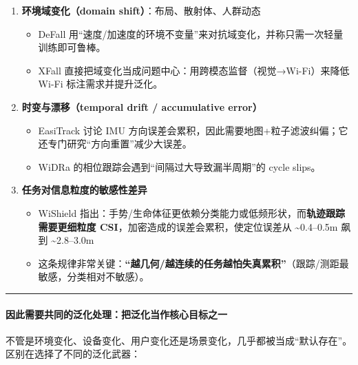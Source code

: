 \documentclass[
]{article}
\begin{document}
\begin{enumerate}
\def\labelenumi{\arabic{enumi}.}
\item
  \textbf{环境域变化（domain shift）}：布局、散射体、人群动态

  \begin{itemize}
  \item
    DeFall
    用``速度/加速度的环境不变量''来对抗域变化，并称只需一次轻量训练即可鲁棒。
  \item
    XFall 直接把域变化当成问题中心：用跨模态监督（视觉→Wi-Fi）来降低
    Wi-Fi 标注需求并提升泛化。
  \end{itemize}
\item
  \textbf{时变与漂移（temporal drift / accumulative error）}

  \begin{itemize}
  \item
    EasiTrack 讨论 IMU
    方向误差会累积，因此需要地图+粒子滤波纠偏；它还专门研究``方向重置''减少大误差。
  \item
    WiDRa 的相位跟踪会遇到``间隔过大导致漏半周期''的 cycle slips。
  \end{itemize}
\item
  \textbf{任务对信息粒度的敏感性差异}

  \begin{itemize}
  \item
    WiShield
    指出：手势/生命体征更依赖分类能力或低频形状，而\textbf{轨迹跟踪需要更细粒度
    CSI}，加密造成的误差会累积，使定位误差从 \textasciitilde0.4--0.5m
    飙到 \textasciitilde2.8--3.0m
  \item
    这条规律非常关键：\textbf{``越几何/越连续的任务越怕失真累积''}（跟踪/测距最敏感，分类相对不敏感）。
  \end{itemize}
\end{enumerate}

\begin{center}\rule{0.5\linewidth}{0.5pt}\end{center}

\paragraph{因此需要共同的泛化处理：把泛化当作核心目标之一}\label{ux56e0ux6b64ux9700ux8981ux5171ux540cux7684ux6cdbux5316ux5904ux7406ux628aux6cdbux5316ux5f53ux4f5cux6838ux5fc3ux76eeux6807ux4e4bux4e00}

不管是环境变化、设备变化、用户变化还是场景变化，几乎都被当成``默认存在''。\\
区别在选择了不同的泛化武器：
\end{document}
